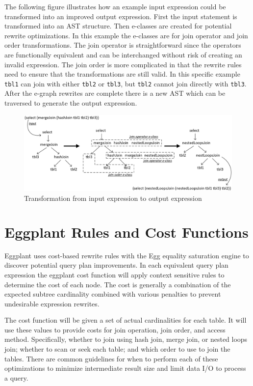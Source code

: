 \documentclass{article}
\begin{document}
The following figure illustrates how an example input expression could be transformed 
into an improved output expression.  First the input statement is transformed into an AST structure.
Then e-classes are created for potential rewrite optimizations.  In this example the e-classes
are for join operator and join order transformations.  The join operator is straightforward 
since the operators are functionally equivalent and can be interchanged without risk of creating
an invalid expression.  The join order is more complicated in that the rewrite rules need to 
ensure that the transformations are still valid.  In this specific example \texttt{tbl1} can 
join with either \texttt{tbl2} or \texttt{tbl3}, but \texttt{tbl2} cannot join directly with 
\texttt{tbl3}.  After the e-graph rewrites are complete there is a new AST which can be traversed
to generate the output expression.

\begin{figure}[H]
\centering
\begin{minipage}[b]{0.9\textwidth}
    \includegraphics[width=\textwidth]{ast_transform.png}
    \caption{Transformation from input expression to output expression}
\end{minipage}
\hfill
\end{figure}

\section*{Eggplant Rules and Cost Functions}
Eggplant uses cost-based rewrite rules with the Egg equality saturation engine
to discover potential query plan improvements.  In each equivalent query plan expression the
eggplant cost function will apply context sensitive rules to determine the cost of each node.
The cost is generally a combination of the expected subtree cardinality combined with
various penalties to prevent undesirable expression rewrites.

The cost function will be given a set of actual cardinalities for each table.  It will use
these values to provide costs for join operation, join order, and access method.  Specifically,
whether to join using hash join, merge join, or nested loops join; whether to scan or seek each
table; and which order to use to join the tables.  There are common guidelines for when to perform
each of these optimizations to minimize intermediate result size and limit data I/O to process
a query.  \cite{West:2020}  
\end{document}
